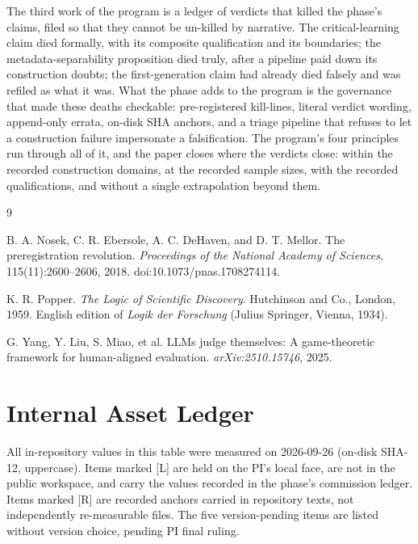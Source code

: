 \documentclass[11pt]{article}
\begin{document}
The third work of the program is a ledger of verdicts that killed the phase's claims, filed so that they cannot be un-killed by narrative. The critical-learning claim died formally, with its composite qualification and its boundaries; the metadata-separability proposition died truly, after a pipeline paid down its construction doubts; the first-generation claim had already died falsely and was refiled as what it was. What the phase adds to the program is the governance that made these deaths checkable: pre-registered kill-lines, literal verdict wording, append-only errata, on-disk SHA anchors, and a triage pipeline that refuses to let a construction failure impersonate a falsification. The program's four principles run through all of it, and the paper closes where the verdicts close: within the recorded construction domains, at the recorded sample sizes, with the recorded qualifications, and without a single extrapolation beyond them.

\begin{thebibliography}{9}

B. A. Nosek, C. R. Ebersole, A. C. DeHaven, and D. T. Mellor.
\newblock The preregistration revolution.
\newblock \emph{Proceedings of the National Academy of Sciences}, 115(11):2600--2606, 2018. doi:10.1073/pnas.1708274114.

K. R. Popper.
\newblock \emph{The Logic of Scientific Discovery}.
\newblock Hutchinson and Co., London, 1959. English edition of \emph{Logik der Forschung} (Julius Springer, Vienna, 1934).

G. Yang, Y. Liu, S. Miao, et al.
\newblock LLMs judge themselves: A game-theoretic framework for human-aligned evaluation.
\newblock \emph{arXiv:2510.15746}, 2025.

\end{thebibliography}

\appendix

\section{Internal Asset Ledger}\label{app:ledger}

All in-repository values in this table were measured on 2026-09-26 (on-disk SHA-12, uppercase). Items marked [L] are held on the PI's local face, are not in the public workspace, and carry the values recorded in the phase's commission ledger. Items marked [R] are recorded anchors carried in repository texts, not independently re-measurable files. The five version-pending items are listed without version choice, pending PI final ruling.
\end{document}
